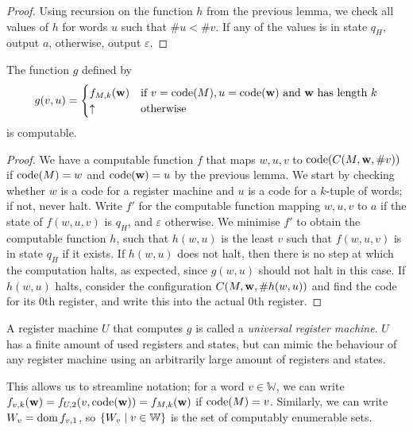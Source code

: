 \begin{proof}
	Using recursion on the function \( h \) from the previous lemma, we check all values of \( h \) for words \( u \) such that \( \# u < \# v \).
	If any of the values is in state \( q_H \), output \( a \), otherwise, output \( \varepsilon \).
\end{proof}
\begin{theorem}
	The function \( g \) defined by
	\[ g(v,u) = \begin{cases}
		f_{M,k}(\vb w) & \text{if } v = \operatorname{code}(M), u = \operatorname{code}(\vb w) \text{ and \( \vb w \) has length \( k \)} \\
		\uparrow & \text{otherwise}
	\end{cases} \]
	is computable.
\end{theorem}
\begin{proof}
	We have a computable function \( f \) that maps \( w, u, v \) to \( \operatorname{code}(C(M,\vb w, \# v)) \) if \( \operatorname{code}(M) = w \) and \( \operatorname{code}(\vb w) = u \) by the previous lemma.
	We start by checking whether \( w \) is a code for a register machine and \( u \) is a code for a \( k \)-tuple of words; if not, never halt.
	Write \( f' \) for the computable function mapping \( w, u, v \) to \( a \) if the state of \( f(w,u,v) \) is \( q_H \), and \( \varepsilon \) otherwise.
	We minimise \( f' \) to obtain the computable function \( h \), such that \( h(w,u) \) is the least \( v \) such that \( f(w,u,v) \) is in state \( q_H \) if it exists.
	If \( h(w,u) \) does not halt, then there is no step at which the computation halts, as expected, since \( g(w,u) \) should not halt in this case.
	If \( h(w,u) \) halts, consider the configuration \( C(M,\vb w, \#h(w,u)) \) and find the code for its 0th register, and write this into the actual 0th register.
\end{proof}
\begin{remark}
	A register machine \( U \) that computes \( g \) is called a \emph{universal register machine}.
	\( U \) has a finite amount of used registers and states, but can mimic the behaviour of any register machine using an arbitrarily large amount of registers and states.

	This allows us to streamline notation; for a word \( v \in \mathbb W \), we can write \( f_{v,k}(\vb w) = f_{U,2}(v,\operatorname{code}(\vb w)) = f_{M,k}(\vb w) \) if \( \operatorname{code}(M) = v \).
	Similarly, we can write \( W_v = \operatorname{dom} f_{v,1} \), so \( \qty{W_v \mid v \in \mathbb W} \) is the set of computably enumerable sets.
\end{remark}

